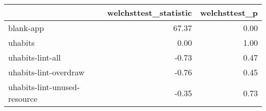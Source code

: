 \begin{tabular}{lrr}
\toprule
{} &  welchsttest\_statistic &  welchsttest\_p \\
\midrule
blank-app                    &                  67.37 &           0.00 \\
uhabits                      &                   0.00 &           1.00 \\
uhabits-lint-all             &                  -0.73 &           0.47 \\
uhabits-lint-overdraw        &                  -0.76 &           0.45 \\
uhabits-lint-unused-resource &                  -0.35 &           0.73 \\
\bottomrule
\end{tabular}
